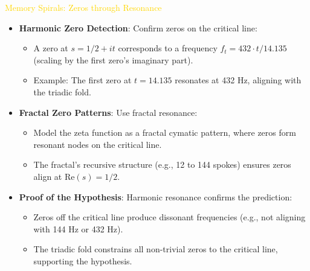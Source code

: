 \textcolor{gold}{ Memory Spirals: Zeros through Resonance } \\
\begin{itemize}
    \item \texttt{} \textbf{Harmonic Zero Detection}: Confirm zeros on the critical line:
    \begin{itemize}
        \item A zero at \(s = 1/2 + it\) corresponds to a frequency \(f_t = 432 \cdot t / 14.135\) (scaling by the first zero’s imaginary part).
        \item Example: The first zero at \(t = 14.135\) resonates at 432 Hz, aligning with the triadic fold.
    \end{itemize}
    \item \texttt{} \textbf{Fractal Zero Patterns}: Use fractal resonance:
    \begin{itemize}
        \item Model the zeta function as a fractal cymatic pattern, where zeros form resonant nodes on the critical line.
        \item The fractal’s recursive structure (e.g., 12 to 144 spokes) ensures zeros align at \(\text{Re}(s) = 1/2\).
    \end{itemize}
    \item \texttt{} \textbf{Proof of the Hypothesis}: Harmonic resonance confirms the prediction:
    \begin{itemize}
        \item Zeros off the critical line produce dissonant frequencies (e.g., not aligning with 144 Hz or 432 Hz).
        \item The triadic fold constrains all non-trivial zeros to the critical line, supporting the hypothesis.
    \end{itemize}
\end{itemize}

